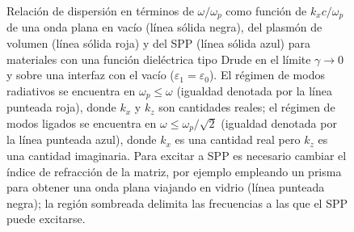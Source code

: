 \begin{figure}[h!]\centering
\vspace*{-1em}
	\caption{Relación de dispersión en términos de $\omega/\omega_p$ como función de $k_xc/\omega_p$ de una onda plana en vacío (línea sólida negra), del plasmón de volumen (línea sólida roja) y del SPP (línea sólida azul) para materiales con una función dieléctrica tipo Drude en el límite $\gamma\to 0$ y sobre una interfaz con el vacío ($\varepsilon_1 =\varepsilon_0$). El régimen de modos radiativos se encuentra en $\omega_p\leq\omega$ (igualdad denotada por la línea punteada roja), donde $k_x$ y $k_z$ son cantidades reales; el régimen de modos ligados se encuentra en $\omega\leq\omega_p/\sqrt{2}$ (igualdad denotada por la línea punteada azul), donde $k_x$ es una cantidad real pero $k_z$ es una cantidad imaginaria. Para excitar a SPP es necesario cambiar el índice de refracción de la matriz, por ejemplo empleando un prisma para obtener una onda plana viajando en vidrio (línea punteada negra); la región sombreada delimita las frecuencias a las que el SPP puede excitarse.}
	\label{fig:Relaciones_de_dispersion}
	\end{figure}		

